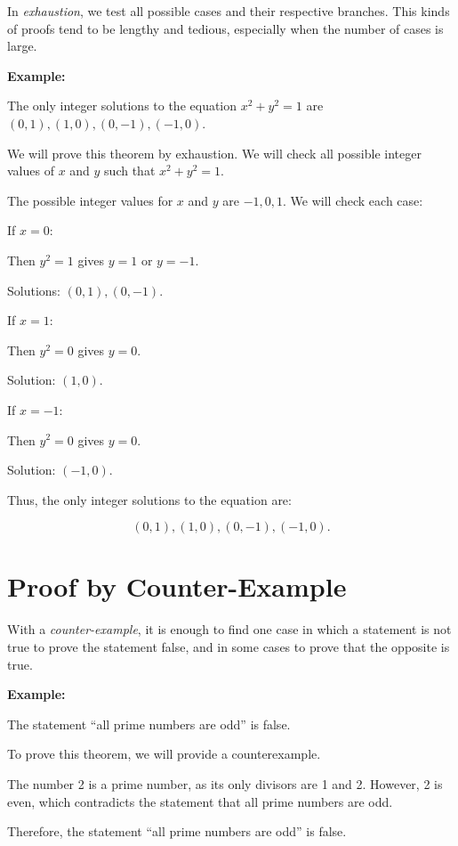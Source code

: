 In \emph{exhaustion}, we test all possible cases and their respective branches. This kinds of proofs tend
to be lengthy and tedious, especially when the number of cases is large.

\textbf{Example:}

The only integer solutions to the equation \( x^2 + y^2 = 1 \) are \( (0, 1), (1, 0), (0, -1), (-1, 0) \).

We will prove this theorem by exhaustion. We will check all possible integer values of \(x\) and
\(y\) such that \( x^2 + y^2 = 1 \).

The possible integer values for \(x\) and \(y\) are \( -1, 0, 1 \). We will check each case:

If \( x = 0 \):

Then \( y^2 = 1 \) gives \( y = 1 \) or \( y = -1 \).

Solutions: \( (0, 1), (0, -1) \).

If \( x = 1 \):

Then \( y^2 = 0 \) gives \( y = 0 \).

Solution: \( (1, 0) \).

If \( x = -1 \):

Then \( y^2 = 0 \) gives \( y = 0 \).

Solution: \( (-1, 0) \).

Thus, the only integer solutions to the equation are:

\[
	(0, 1), (1, 0), (0, -1), (-1, 0).
\]

\QED

\section{Proof by Counter-Example}

With a \emph{counter-example}, it is enough to find one case in which a statement is not true to prove the
statement false, and in some cases to prove that the opposite is true.

\textbf{Example:}

The statement ``all prime numbers are odd'' is false.

To prove this theorem, we will provide a counterexample.

The number 2 is a prime number, as its only divisors are 1 and 2. However, 2 is
even, which contradicts the statement that all prime numbers are odd.

Therefore, the statement ``all prime numbers are odd'' is false.

\QED

